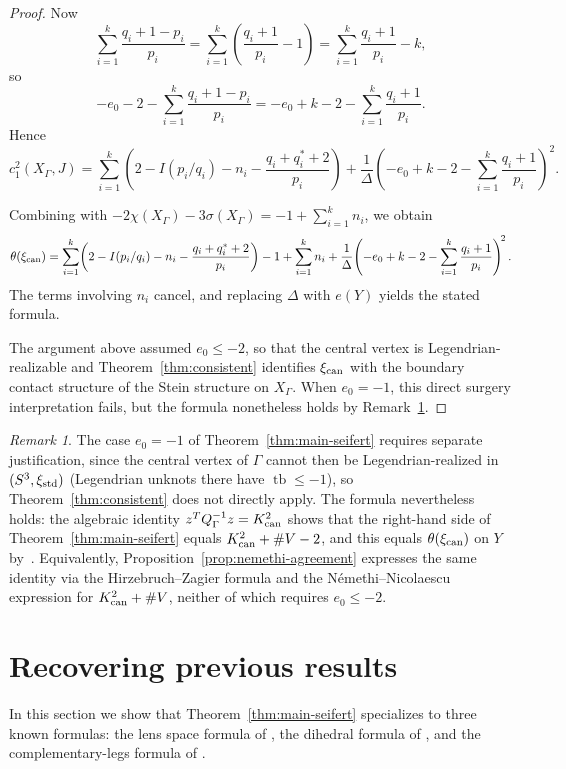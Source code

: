 \documentclass[11pt]{amsart}
\theoremstyle{plain}
\theoremstyle{definition}
\theoremstyle{remark}
\newtheorem{remark}[theorem]{Remark}
\DeclareMathOperator\tb{tb}
\begin{document}
\begin{proof}
Now
\[
\sum_{i=1}^k\frac{q_i+1-p_i}{p_i}
=
\sum_{i=1}^k\!\left(\frac{q_i+1}{p_i}-1\right)
=
\sum_{i=1}^k\frac{q_i+1}{p_i}-k,
\]
so
\[
-e_0-2-\sum_{i=1}^k\frac{q_i+1-p_i}{p_i}
=
-e_0+k-2-\sum_{i=1}^k\frac{q_i+1}{p_i}.
\]
Hence
\[
c_1^2(X_\Gamma,J)
=
\sum_{i=1}^k\!\left(2-I(p_i/q_i)-n_i-\frac{q_i+q_i^*+2}{p_i}\right)
+
\frac{1}{\Delta}\!\left(-e_0+k-2-\sum_{i=1}^k\frac{q_i+1}{p_i}\right)^{\!2}.
\]

Combining with $-2\chi(X_\Gamma)-3\sigma(X_\Gamma)=-1+\sum_{i=1}^k n_i$,
we obtain
\[
\theta(\xi_{\rm can})
=
\sum_{i=1}^k\!\left(2-I(p_i/q_i)-n_i-\frac{q_i+q_i^*+2}{p_i}\right)
-1+\sum_{i=1}^k n_i
+
\frac{1}{\Delta}\!\left(-e_0+k-2-\sum_{i=1}^k\frac{q_i+1}{p_i}\right)^{\!2}.
\]
The terms involving $n_i$ cancel, and replacing $\Delta$ with $e(Y)$
yields the stated formula.

The argument above assumed $e_0\le -2$, so that the central vertex
is Legendrian-realizable and Theorem~\ref{thm:consistent} identifies
$\xi_{\rm can}$ with the boundary contact structure of the Stein
structure on $X_\Gamma$. When $e_0=-1$, this direct surgery
interpretation fails, but the formula nonetheless holds by
Remark~\ref{rem:e0-minus-one}.
\end{proof}

\begin{remark}\label{rem:e0-minus-one}
The case $e_0=-1$ of Theorem~\ref{thm:main-seifert} requires separate
justification, since the central vertex of $\Gamma$ cannot then be
Legendrian-realized in $(S^3,\xi_{\rm std})$ (Legendrian unknots
there have $\tb\le -1$), so Theorem~\ref{thm:consistent} does not
directly apply. The formula nevertheless holds: the algebraic
identity $z^T Q_\Gamma^{-1}z = K_{\rm can}^2$ shows that the
right-hand side of Theorem~\ref{thm:main-seifert} equals
$K_{\rm can}^2+\#V-2$, and this equals $\theta(\xi_{\rm can})$ on $Y$
by~\cite[Remark~4.8]{NemethiNicolaescu2002}. Equivalently,
Proposition~\ref{prop:nemethi-agreement} expresses the same identity
via the Hirzebruch--Zagier formula and the
N\'emethi--Nicolaescu expression for $K_{\rm can}^2+\#V$, neither of
which requires $e_0\le -2$.
\end{remark}

\section{Recovering previous results}\label{sec:recover}

In this section we show that Theorem~\ref{thm:main-seifert}
specializes to three known formulas: the lens space formula of
\cite[Prop.~9.3]{EtnyreOzbagciTosun2025}, the dihedral formula of
\cite[Prop.~9.8]{EtnyreOzbagciTosun2025}, and the complementary-legs
formula of \cite[Prop.~4.4]{EtnyreOzbagciTosun2026}.
\end{document}
